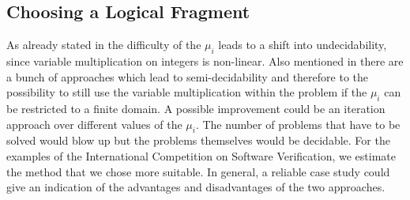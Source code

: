 \subsection{Choosing a Logical Fragment}
As already stated in  the difficulty of the $\mu_i$ leads to a shift into undecidability, since variable multiplication on integers is non-linear. Also mentioned in  there are a bunch of approaches which lead to semi-decidability and therefore to the possibility to still use the variable multiplication within the problem if the $\mu_i$ can be restricted to a finite domain.\newline
A possible improvement could be an iteration approach over different values of the $\mu_i$. The number of problems that have to be solved would blow up but the problems themselves would be decidable.\newline
For the examples of the International Competition on Software Verification, we estimate the method that we chose more suitable. In general, a reliable case study could give an indication of the advantages and disadvantages of the two approaches.

